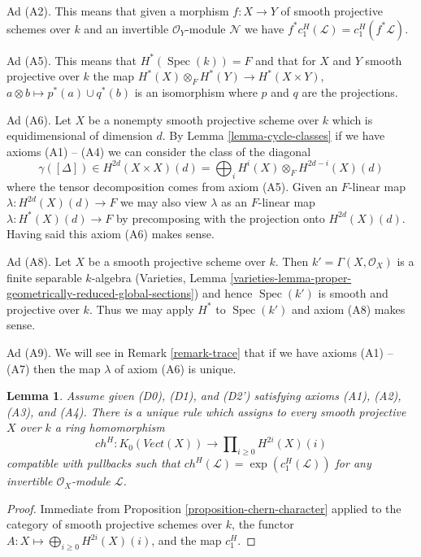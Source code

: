 \documentclass{stacks-project}
\theoremstyle{plain}
\newtheorem{lemma}[subsection]{Lemma}
\theoremstyle{definition}
\theoremstyle{remark}
\numberwithin{equation}{subsection}
\def\Spec{\mathop{\mathrm{Spec}}}
\begin{document}
\medskip\noindent
Ad (A2). This means that given a morphism $f : X \to Y$ of smooth projective
schemes over $k$ and an invertible $\mathcal{O}_Y$-module $\mathcal{N}$
we have $f^*c_1^H(\mathcal{L}) = c_1^H(f^*\mathcal{L})$.

\medskip\noindent
Ad (A5). This means that $H^*(\Spec(k)) = F$ and that for $X$ and $Y$ smooth
projective over $k$ the map $H^*(X) \otimes_F H^*(Y) \to H^*(X \times Y)$,
$a \otimes b \mapsto p^*(a) \cup q^*(b)$ is an isomorphism
where $p$ and $q$ are the projections.

\medskip\noindent
Ad (A6). Let $X$ be a nonempty smooth projective scheme over $k$
which is equidimensional of dimension $d$. By Lemma \ref{lemma-cycle-classes}
if we have axioms (A1) -- (A4) we can consider the class of the diagonal
$$
\gamma([\Delta]) \in
H^{2d}(X \times X)(d) = \bigoplus\nolimits_i H^i(X) \otimes_F H^{2d - i}(X)(d)
$$
where the tensor decomposition comes from axiom (A5).
Given an $F$-linear map $\lambda : H^{2d}(X)(d) \to F$ we may also view
$\lambda$ as an $F$-linear map $\lambda : H^*(X)(d) \to F$ by precomposing
with the projection onto $H^{2d}(X)(d)$. Having said this axiom (A6)
makes sense.

\medskip\noindent
Ad (A8). Let $X$ be a smooth projective scheme over $k$.
Then $k' = \Gamma(X, \mathcal{O}_X)$ is a finite separable
$k$-algebra (Varieties, Lemma
\ref{varieties-lemma-proper-geometrically-reduced-global-sections})
and hence $\Spec(k')$ is smooth and projective over $k$.
Thus we may apply $H^*$ to $\Spec(k')$ and axiom (A8) makes sense.

\medskip\noindent
Ad (A9). We will see in Remark \ref{remark-trace} that if we have
axioms (A1) -- (A7) then the map $\lambda$ of axiom (A6) is unique.

\begin{lemma}
\label{lemma-chern-classes}
Assume given (D0), (D1), and (D2') satisfying axioms (A1), (A2), (A3), and (A4).
There is a unique rule which assigns to every smooth projective $X$ over $k$
a ring homomorphism
$$
ch^H :
K_0(\textit{Vect}(X))
\longrightarrow
\prod\nolimits_{i \geq 0} H^{2i}(X)(i)
$$
compatible with pullbacks such that
$ch^H(\mathcal{L}) = \exp(c_1^H(\mathcal{L}))$
for any invertible $\mathcal{O}_X$-module $\mathcal{L}$.
\end{lemma}

\begin{proof}
Immediate from Proposition \ref{proposition-chern-character}
applied to the category of smooth projective schemes over $k$,
the functor $A : X \mapsto \bigoplus_{i \geq 0} H^{2i}(X)(i)$,
and the map $c_1^H$.
\end{proof}
\end{document}
